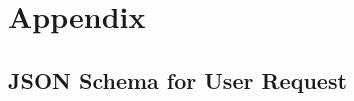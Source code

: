 %
%
%                 

\chapter{Appendix}
\label{sec:appendixa}



\section{JSON Schema for User Request}

